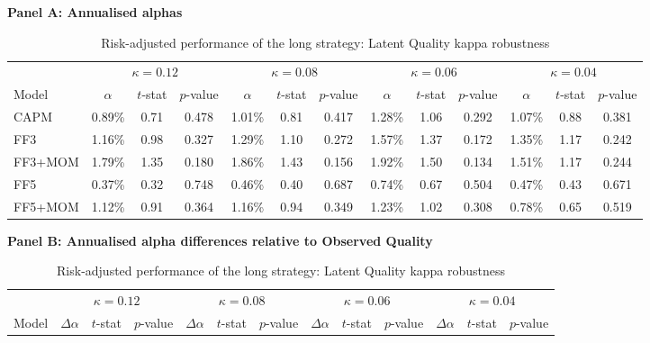 \begin{table}[H]
\centering
\scriptsize
\renewcommand{\arraystretch}{1.12}
\setlength{\tabcolsep}{3pt}
\caption{Risk-adjusted performance of the long strategy: Latent Quality kappa robustness}
\label{tab:latent_kappa_q5_alpha_results}
\begin{threeparttable}
{\centering\textbf{Panel A: Annualised alphas}\par}
\vspace{0.4em}
\begin{tabular*}{\textwidth}{@{\extracolsep{\fill}}lcccccccccccc}
\toprule
 & \multicolumn{3}{c}{$\kappa=0.12$} & \multicolumn{3}{c}{$\kappa=0.08$} & \multicolumn{3}{c}{$\kappa=0.06$} & \multicolumn{3}{c}{$\kappa=0.04$} \\
\cmidrule(lr){2-4} \cmidrule(lr){5-7} \cmidrule(lr){8-10} \cmidrule(lr){11-13}
Model & $\alpha$ & $t$-stat & $p$-value & $\alpha$ & $t$-stat & $p$-value & $\alpha$ & $t$-stat & $p$-value & $\alpha$ & $t$-stat & $p$-value \\
\midrule
CAPM      & 0.89\% & 0.71 & 0.478 & 1.01\% & 0.81 & 0.417 & 1.28\% & 1.06 & 0.292 & 1.07\% & 0.88 & 0.381 \\
FF3       & 1.16\% & 0.98 & 0.327 & 1.29\% & 1.10 & 0.272 & 1.57\% & 1.37 & 0.172 & 1.35\% & 1.17 & 0.242 \\
FF3+MOM   & 1.79\% & 1.35 & 0.180 & 1.86\% & 1.43 & 0.156 & 1.92\% & 1.50 & 0.134 & 1.51\% & 1.17 & 0.244 \\
FF5       & 0.37\% & 0.32 & 0.748 & 0.46\% & 0.40 & 0.687 & 0.74\% & 0.67 & 0.504 & 0.47\% & 0.43 & 0.671 \\
FF5+MOM   & 1.12\% & 0.91 & 0.364 & 1.16\% & 0.94 & 0.349 & 1.23\% & 1.02 & 0.308 & 0.78\% & 0.65 & 0.519 \\
\bottomrule
\end{tabular*}
\vspace{1em}
{\centering\textbf{Panel B: Annualised alpha differences relative to Observed Quality}\par}
\vspace{0.4em}
\begin{tabular*}{\textwidth}{@{\extracolsep{\fill}}lcccccccccccc}
\toprule
 & \multicolumn{3}{c}{$\kappa=0.12$} & \multicolumn{3}{c}{$\kappa=0.08$} & \multicolumn{3}{c}{$\kappa=0.06$} & \multicolumn{3}{c}{$\kappa=0.04$} \\
\cmidrule(lr){2-4} \cmidrule(lr){5-7} \cmidrule(lr){8-10} \cmidrule(lr){11-13}
Model & $\Delta\alpha$ & $t$-stat & $p$-value & $\Delta\alpha$ & $t$-stat & $p$-value & $\Delta\alpha$ & $t$-stat & $p$-value & $\Delta\alpha$ & $t$-stat & $p$-value \\

\end{tabular*}
\end{threeparttable}
\end{table}
